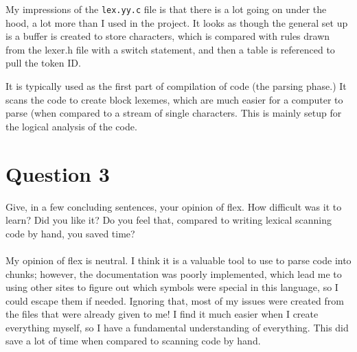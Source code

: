 \documentclass{article}
\begin{document}
My impressions of the \verb|lex.yy.c| file is that there is a lot going on under the hood, a lot more than I used in the project. 
It looks as though the general set up is a buffer is created to store characters, which is compared with rules drawn from the lexer.h file with a switch statement, and then a table is referenced to pull the token ID. 

It is typically used as the first part of compilation of code (the parsing phase.) 
It scans the code to create block lexemes, which are much easier for a computer to parse (when compared to a stream of single characters. 
This is mainly setup for the logical analysis of the code. 

\section{Question 3}
Give, in a few concluding sentences, your opinion of flex. How difficult was it to learn? Did you like it? Do you feel that, compared to writing lexical scanning code by hand, you saved time?
\\~\\
My opinion of flex is neutral. 
I think it is a valuable tool to use to parse code into chunks;
however, the documentation was poorly implemented, which lead me to using other sites to figure out which symbols were special in this language, so I could escape them if needed. 
Ignoring that, most of my issues were created from the files that were already given to me!
I find it much easier when I create everything myself, so I have a fundamental understanding of everything.
This did save a lot of time when compared to scanning code by hand. 
\end{document}
